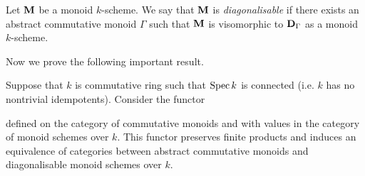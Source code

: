 \begin{definition}
Let $\mathbf{M}$ be a monoid $k$-scheme. We say that $\mathbf{M}$ is \textit{diagonalisable} if there exists an abstract commutative monoid $\Gamma$ such that $\mathbf{M}$ is visomorphic to $\mathbf{D}_{\Gamma}$ as a monoid $k$-scheme.
\end{definition}
\noindent
Now we prove the following important result.

\begin{theorem}\label{theorem:commutative_monoids_and_diagonalisable_monoid_k_schemes}
Suppose that $k$ is commutative ring such that $\mathrm{Spec}\, k$ is connected (i.e. $k$ has no nontrivial idempotents). Consider the functor 
\begin{center}
\end{center}
defined on the category of commutative monoids and with values in the category of monoid schemes over $k$. This functor preserves finite products and induces an equivalence of categories between abstract commutative monoids and diagonalisable monoid schemes over $k$.
\end{theorem}
